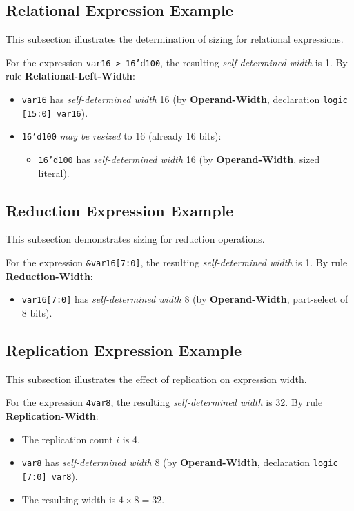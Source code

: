 \documentclass{article}
\newcommand{\sv}[1]{\texttt{#1}}
\newcommand{\sds}{\emph{self-determined width}}
\newcommand{\mbr}{\emph{may be resized}}
\begin{document}
\subsection{Relational Expression Example}

This subsection illustrates the determination of sizing for relational
expressions.

For the expression \sv{var16 > 16'd100}, the resulting \sds{} is 1.
By rule \textbf{Relational-Left-Width}:
\begin{itemize}
  \item \sv{var16} has \sds{} 16 (by \textbf{Operand-Width},
    declaration \sv{logic [15:0] var16}).
  \item \sv{16'd100} \mbr{} to 16 (already 16 bits):
    \begin{itemize}
      \item \sv{16'd100} has \sds{} 16 (by
        \textbf{Operand-Width}, sized literal).
    \end{itemize}
\end{itemize}

\subsection{Reduction Expression Example}

This subsection demonstrates sizing for reduction operations.

For the expression \sv{&var16[7:0]}, the resulting \sds{} is 1.
By rule \textbf{Reduction-Width}:
\begin{itemize}
  \item \sv{var16[7:0]} has \sds{} 8 (by
    \textbf{Operand-Width}, part-select of 8 bits).
\end{itemize}

\subsection{Replication Expression Example}

This subsection illustrates the effect of replication on expression
width.

For the expression \sv{{4{var8}}}, the resulting \sds{} is 32.
By rule \textbf{Replication-Width}:
\begin{itemize}
  \item The replication count $i$ is 4.
  \item \sv{var8} has \sds{} 8 (by \textbf{Operand-Width},
    declaration \sv{logic [7:0] var8}).
  \item The resulting width is $4 \times 8 = 32$.
\end{itemize}
\end{document}
